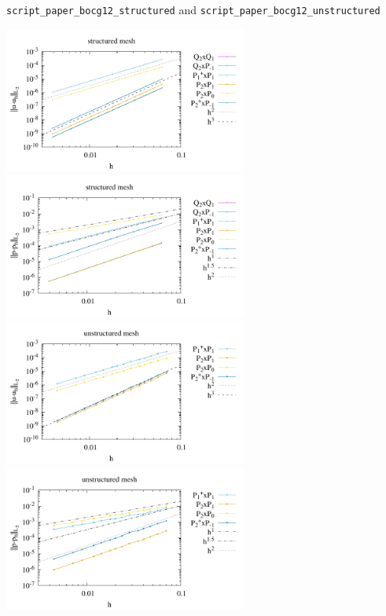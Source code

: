 {\tt script\_paper\_bocg12\_structured} and {\tt script\_paper\_bocg12\_unstructured}

\begin{center}
\includegraphics[width=8cm]{python_codes/fieldstone_120/paperresults/bocg12_structured_errorsV.pdf}
\includegraphics[width=8cm]{python_codes/fieldstone_120/paperresults/bocg12_structured_errorsP.pdf}\\
\includegraphics[width=8cm]{python_codes/fieldstone_120/paperresults/bocg12_unstructured_errorsV.pdf}
\includegraphics[width=8cm]{python_codes/fieldstone_120/paperresults/bocg12_unstructured_errorsP.pdf}
\end{center}


